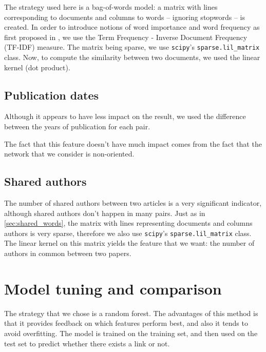 \documentclass{article}
\newcommand{\code}[1]{\texttt{#1}}
\begin{document}
The strategy used here is a bag-of-words model: a matrix with lines corresponding to documents and columns to words -- ignoring stopwords -- is created.
In order to introduce notions of word importance and word frequency as first proposed in \cite{sparck1972statistical}, we use the Term Frequency - Inverse Document Frequency (TF-IDF) measure. The matrix being sparse, we use \code{scipy}'s \code{sparse.lil\_matrix} class.
Now, to compute the similarity between two documents, we used the linear kernel (dot product).

\subsection{Publication dates}

Although it appears to have less impact on the result, we used the difference between the years of publication for each pair.

The fact that this feature doesn't have much impact comes from the fact that the network that we consider is non-oriented.

\subsection{Shared authors}

The number of shared authors between two articles is a very significant indicator, although shared authors don't happen in many pairs.
Just as in \ref{sec:shared_words}, the matrix with lines representing documents and columns authors is very sparse, therefore we also use \code{scipy}'s \code{sparse.lil\_matrix} class. The linear kernel on this matrix yields the feature that we want: the number of authors in common between two papers.

\section{Model tuning and comparison}
\label{sec:experiments}

The strategy that we chose is a random forest. The advantages of this method is that it provides feedback on which features perform best, and also it tends to avoid overfitting. The model is trained on the training set, and then used on the test set to predict whether there exists a link or not.







\end{document}
